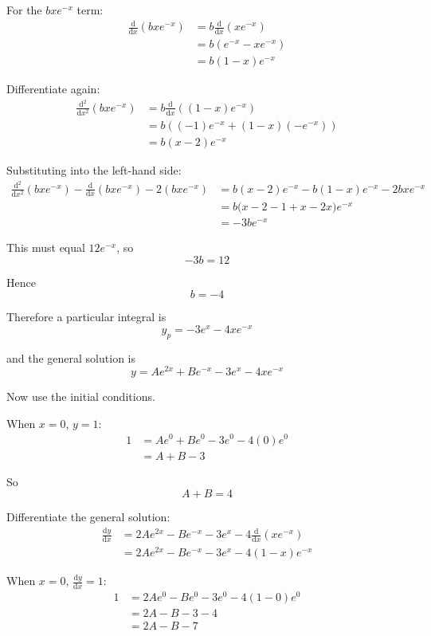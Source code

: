 \documentclass[leqno]{article}
\begin{document}
\begin{enumerate}[
  label=\textbf{\arabic*.},
  leftmargin=*,
  topsep=0pt,
  partopsep=0pt,
  parsep=0pt
]
\begin{djsSolution}
\begin{enumerate}[label=\textbf{(\alph*)}]
For the $bxe^{-x}$ term:
\begin{align*}
\frac{\mathrm{d}}{\mathrm{d}x}(bxe^{-x})
&=b\frac{\mathrm{d}}{\mathrm{d}x}(xe^{-x})\\
&=b\left(e^{-x}-xe^{-x}\right)\\
&=b(1-x)e^{-x}
\end{align*}

Differentiate again:
\begin{align*}
\frac{\mathrm{d}^2}{\mathrm{d}x^2}(bxe^{-x})
&=b\frac{\mathrm{d}}{\mathrm{d}x}\left((1-x)e^{-x}\right)\\
&=b\left((-1)e^{-x}+(1-x)(-e^{-x})\right)\\
&=b(x-2)e^{-x}
\end{align*}

Substituting into the left-hand side:
\begin{align*}
\frac{\mathrm{d}^2}{\mathrm{d}x^2}(bxe^{-x})-\frac{\mathrm{d}}{\mathrm{d}x}(bxe^{-x})-2(bxe^{-x})
&=b(x-2)e^{-x}-b(1-x)e^{-x}-2bxe^{-x}\\
&=b\bigl(x-2-1+x-2x\bigr)e^{-x}\\
&=-3be^{-x}
\end{align*}

This must equal $12e^{-x}$, so
\[
-3b=12
\]

Hence
\[
b=-4
\]

Therefore a particular integral is
\[
y_p=-3e^x-4xe^{-x}
\]

and the general solution is
\[
y=Ae^{2x}+Be^{-x}-3e^x-4xe^{-x}
\]

Now use the initial conditions.

When $x=0$, $y=1$:
\begin{align*}
1
&=Ae^0+Be^0-3e^0-4(0)e^0\\
&=A+B-3
\end{align*}

So
\[
A+B=4
\]

Differentiate the general solution:
\begin{align*}
\frac{\mathrm{d}y}{\mathrm{d}x}
&=2Ae^{2x}-Be^{-x}-3e^x-4\frac{\mathrm{d}}{\mathrm{d}x}(xe^{-x})\\
&=2Ae^{2x}-Be^{-x}-3e^x-4(1-x)e^{-x}
\end{align*}

When $x=0$, $\frac{\mathrm{d}y}{\mathrm{d}x}=1$:
\begin{align*}
1
&=2Ae^0-Be^0-3e^0-4(1-0)e^0\\
&=2A-B-3-4\\
&=2A-B-7
\end{align*}


\end{enumerate}
\end{djsSolution}
\end{enumerate}
\end{document}
